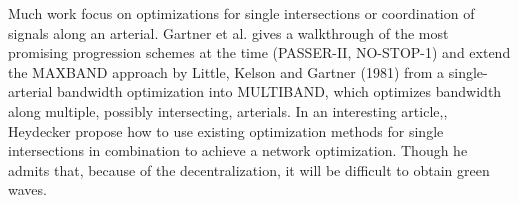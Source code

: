 Much work focus on optimizations for single intersections or coordination of signals along an arterial. Gartner et al. \cite{9} gives a walkthrough of the most promising progression schemes at the time (PASSER-II, NO-STOP-1) and extend the MAXBAND approach by Little, Kelson and Gartner (1981) from a single-arterial bandwidth optimization into MULTIBAND, which optimizes bandwidth along multiple, possibly intersecting, arterials.
In an interesting article,\cite{24}, Heydecker propose how to use existing optimization methods for single intersections in combination to achieve a network optimization. Though he admits that, because of the decentralization, it will be difficult to obtain green waves.